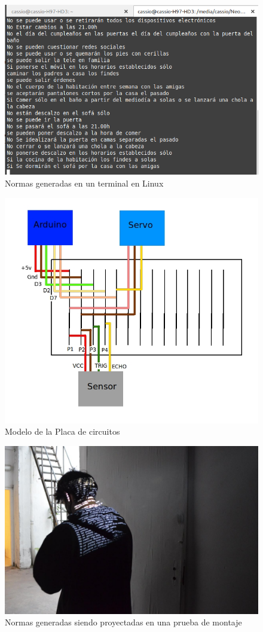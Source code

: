 \documentclass[12pt,twocolumn]{article}
\begin{document}
\begin{figure}[H]
\centering
\includegraphics[scale=0.45]{img/Normas Generadas En Terminal} 
\caption{Normas generadas en un terminal en Linux} 
\end{figure}


\begin{figure}[H]
\centering
\includegraphics[scale=0.45]{img/Modelo Protoboard} 
\caption{Modelo de la Placa de circuitos} 
\end{figure}

 
\begin{figure}[H]
\centering
\includegraphics[scale=0.25]{img/Normas Proyectadas} 
\caption{Normas generadas siendo proyectadas en una prueba de montaje} 
\end{figure}
\end{document}
